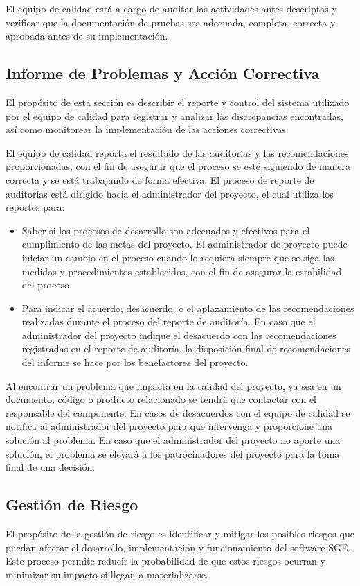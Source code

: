 \documentclass[a4paper,10pt]{article}
\begin{document}
	El equipo de calidad está a cargo de auditar las actividades antes descriptas y verificar que la documentación de pruebas sea adecuada, completa, correcta y aprobada antes de su implementación.
	
	\subsection{Informe de Problemas y Acción Correctiva}
	
	El propósito de esta sección es describir el reporte y control del sistema utilizado por el equipo de calidad para registrar y analizar las discrepancias encontradas, así como monitorear la implementación de las acciones correctivas.
	
	El equipo de calidad reporta el resultado de las auditorías y las recomendaciones proporcionadas, con el fin de asegurar que el proceso se esté siguiendo de manera correcta y se está trabajando de forma efectiva. El proceso de reporte de auditorías está dirigido hacia el administrador del proyecto, el cual utiliza los reportes para:
	\begin{itemize}
		\item Saber si los procesos de desarrollo son adecuados y efectivos para el cumplimiento de las metas del proyecto. El administrador de proyecto puede iniciar un cambio en el proceso cuando lo requiera siempre que se siga las medidas y procedimientos establecidos, con el fin de asegurar la estabilidad del proceso.
		\item Para indicar el acuerdo, desacuerdo, o el aplazamiento de las recomendaciones realizadas durante el proceso del reporte de auditoría. En caso que el administrador del proyecto indique el desacuerdo con las recomendaciones registradas en el reporte de auditoría, la disposición final de recomendaciones del informe se hace por los benefactores del proyecto.
	\end{itemize}
	
	Al encontrar un problema que impacta en la calidad del proyecto, ya sea en un documento, código o producto relacionado se tendrá que contactar con el responsable del componente. En casos de desacuerdos con el equipo de calidad se notifica al administrador del proyecto para que intervenga y proporcione una solución al problema. En caso que el administrador del proyecto no aporte una solución, el problema se elevará a los patrocinadores del proyecto para la toma final de una decisión.
	
	\subsection{Gestión de Riesgo}
	El propósito de la gestión de riesgo es identificar y mitigar los posibles riesgos que puedan afectar el desarrollo, implementación y funcionamiento del software SGE. Este proceso permite reducir la probabilidad de que estos riesgos ocurran y minimizar su impacto si llegan a materializarse. 
	
\end{document}
